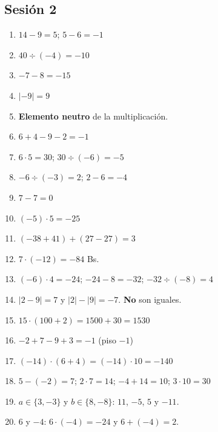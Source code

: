 \documentclass[12pt, letterpaper]{article}
\begin{document}
\subsection*{Sesión 2}
\begin{enumerate}[leftmargin=*, label=\textbf{\arabic*.}]
  \item $14 - 9 = 5$; $5 - 6 = -1$
  \item $40 \div (-4) = -10$
  \item $-7 - 8 = -15$
  \item $|-9| = 9$
  \item \textbf{Elemento neutro} de la multiplicación.
  \item $6 + 4 - 9 - 2 = -1$
  \item $6 \cdot 5 = 30$; $30 \div (-6) = -5$
  \item $-6 \div (-3) = 2$; $2 - 6 = -4$
  \item $7 - 7 = 0$
  \item $(-5) \cdot 5 = -25$
  \item $(-38 + 41) + (27 - 27) = 3$
  \item $7 \cdot (-12) = -84$ Bs.
  \item $(-6) \cdot 4 = -24$; $-24 - 8 = -32$; $-32 \div (-8) = 4$
  \item $|2 - 9| = 7$ y $|2| - |9| = -7$. \textbf{No} son iguales.
  \item $15 \cdot (100 + 2) = 1500 + 30 = 1530$
  \item $-2 + 7 - 9 + 3 = -1$ (piso $-1$)
  \item $(-14) \cdot (6 + 4) = (-14) \cdot 10 = -140$
  \item $5 - (-2) = 7$; $2 \cdot 7 = 14$; $-4 + 14 = 10$; $3 \cdot 10 = 30$
  \item $a \in \{3, -3\}$ y $b \in \{8, -8\}$: $11$, $-5$, $5$ y $-11$.
  \item $6$ y $-4$: $6 \cdot (-4) = -24$ y $6 + (-4) = 2$.
\end{enumerate}
\end{document}
